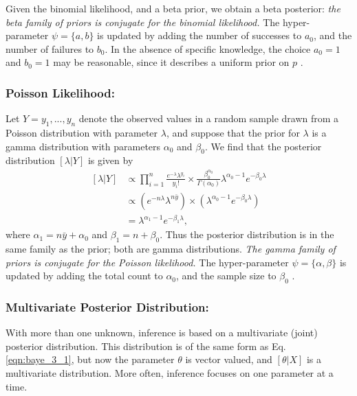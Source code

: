 \documentclass[12pt,oneside,a4paper]{book}
\theoremstyle{definition}
\theoremstyle{remark}
\begin{document}
					Given the binomial likelihood, and a beta prior, we obtain a beta posterior: \textit{the beta family of priors is conjugate for the binomial likelihood.} The hyper-parameter $\psi = \{ a,b\}$ is updated by adding the number of successes to $a_0$, and the number of failures to $b_0$.
					In the absence of specific knowledge, the choice $a_0 = 1$ and $b_0 = 1$ may be reasonable, since it describes a uniform prior on $p$ \cite{link2009bayesian}.

				\subsubsection{Poisson Likelihood:}
					Let $Y = { y_1,. . . ,y_n}$ denote the observed values in a random sample drawn from a Poisson distribution with parameter $\lambda$, and suppose that the prior for $\lambda$ is a gamma distribution with parameters $\alpha_0$ and $\beta_0$. We find that the posterior distribution $[\lambda|Y ]$ is given by
					\begin{equation*}
						\begin{aligned}
							[\lambda|Y] &\propto \prod_{i=1}^{n}\frac{e^{-\lambda}\lambda^{y_i}}{y_i!} \times \frac{\beta^{\alpha_0}_0}{\Gamma(\alpha_0)}\lambda^{\alpha_0 -1}e^{-\beta_0\lambda}\\
							&\propto (e^{-n\lambda}\lambda^{n\bar{y}})\times (\lambda^{\alpha_0-1}e^{-\beta_0\lambda})\\
							&=\lambda^{\alpha_1-1}e^{-\beta_1\lambda},
						\end{aligned}
					\end{equation*}
					where $\alpha_1 = n\bar{y}+\alpha_0$ and $\beta_1=n+\beta_0$.
					Thus the posterior distribution is in the same family as the prior; both are gamma distributions. \textit{The gamma family of priors is conjugate for the Poisson likelihood.} The hyper-parameter $\psi = \{ \alpha,\beta \}$	is updated by adding the total count to $\alpha_0$, and the sample size to $\beta_0$ \cite{link2009bayesian}.


				\subsubsection{ Multivariate Posterior Distribution:}
					With more than one unknown, inference is based on a multivariate (joint) posterior distribution. This distribution is of the same form as Eq. \eqref{eqn:baye_3_1}, but now the parameter $\theta$ is vector valued, and $[\theta|X]$ is a multivariate distribution. More often, inference focuses on one parameter at a time.
\end{document}
